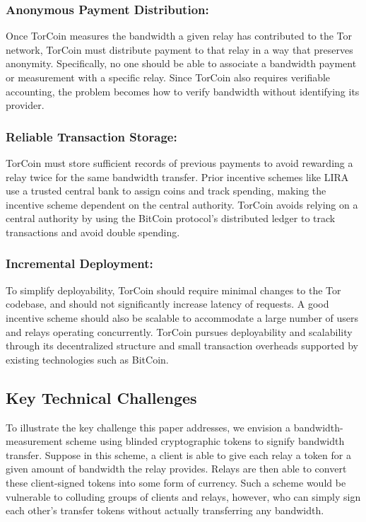 \subsubsection{Anonymous Payment Distribution:} Once TorCoin measures
the bandwidth a given relay has contributed to the Tor network,
TorCoin must distribute payment to that relay in a way
that preserves anonymity. Specifically, no one should be able to
associate a bandwidth payment or measurement with a specific relay. Since
TorCoin also requires verifiable accounting, the problem becomes how to verify
bandwidth without identifying its provider.

\subsubsection{Reliable Transaction Storage:} TorCoin must
store sufficient records of previous payments to avoid rewarding a relay twice
for the same bandwidth transfer. Prior incentive schemes like
LIRA\cite{jansen2013lira} use a trusted central bank to assign coins and track
spending, making the incentive scheme dependent on the central
authority. TorCoin avoids relying on a central authority
by using the BitCoin protocol's distributed ledger to
track transactions and avoid double spending\cite{karame2012two}.

\subsubsection{Incremental Deployment:} To simplify
deployability, TorCoin should require minimal changes to the Tor codebase, and
should not significantly increase latency of requests. A good incentive scheme
should also be scalable to accommodate a large number of users and relays
operating concurrently.
TorCoin pursues deployability and scalability through
its decentralized structure and small transaction overheads
supported by existing technologies such as BitCoin.

\subsection{Key Technical Challenges}

To illustrate the key challenge this paper addresses,
we envision a \naive bandwidth-measurement scheme using blinded
cryptographic tokens to signify bandwidth transfer. Suppose in this scheme, a
client is able to give each relay a token for a given amount of bandwidth
the relay provides.
Relays are then able to convert these client-signed tokens into some
form of currency.  Such a scheme would be vulnerable to colluding groups of
clients and relays, however, who can simply sign each other's transfer tokens
without actually transferring any bandwidth.

